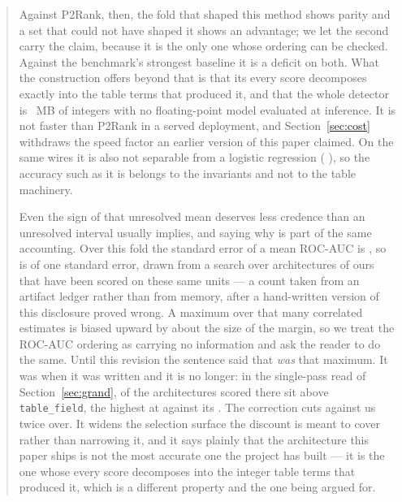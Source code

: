 \documentclass[11pt]{article}
\begin{document}
\begin{abstract}
Against P2Rank, then, the fold that shaped this method shows parity and a set
that could not have shaped it shows an advantage; we let the second carry the
claim, because it is the only one whose ordering can be checked. Against the
benchmark's strongest baseline it is a deficit on both. What
the construction offers beyond that is that its every score decomposes exactly
into the table terms that produced it, and that the whole detector is
\FairModelOurs{}~MB of integers with no floating-point model evaluated at
inference. It is not faster than P2Rank in a served deployment, and
Section~\ref{sec:cost} withdraws the speed factor an earlier version of this
paper claimed. On the same wires it is also not separable from a logistic
regression (\RdLogitDelta{} \RdLogitCI{}), so the accuracy such as it is belongs
to the invariants and not to the table machinery.

Even the sign of that unresolved mean deserves less credence than an unresolved
interval usually implies, and saying why is part of the same accounting. Over
this fold the standard error of
a mean ROC-AUC is \FoldSE{}, so \TabAucD{} is \LeadInSE{} of one standard error,
drawn from a search over \NArchOnFold{} architectures of ours that have been
scored on these same units --- a count taken from an artifact ledger rather than
from memory, after a hand-written version of this disclosure proved wrong. A
maximum over that many correlated estimates is biased upward by about the size
of the margin, so we treat the ROC-AUC ordering as carrying no information and
ask the reader to do the same. Until this revision the sentence said that
\TabAucD{} \emph{was} that maximum. It was when it was written and it is no
longer: in the single-pass read of Section~\ref{sec:grand}, \GrandNAboveTab{} of
the \GrandNOurs{} architectures scored there sit above \texttt{table\_field},
the highest at \GrandBestRoc{} against its \GrandTabRoc{}. The correction cuts
against us twice over. It widens the selection surface the discount is meant to
cover rather than narrowing it, and it says plainly that the architecture this
paper ships is not the most accurate one the project has built --- it is the one
whose every score decomposes into the integer table terms that produced it,
which is a different property and the one being argued for.


\end{abstract}
\end{document}
